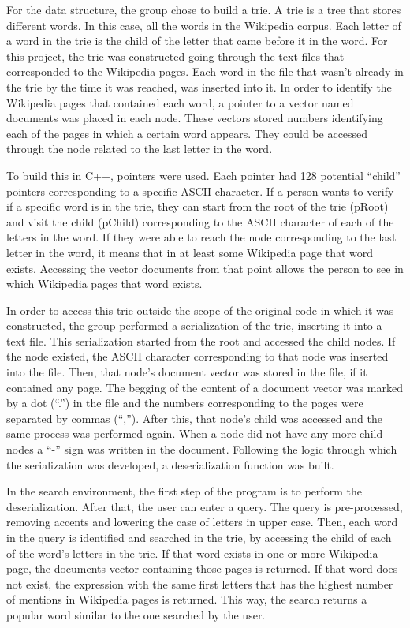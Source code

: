 \documentclass{article}
\begin{document}
For the data structure, the group chose to build a trie. A trie is a tree that stores different words. In this case, all the words in the Wikipedia corpus. Each letter of a word in the trie is the child of the letter that came before it in the word. 
For this project, the trie was constructed going through the text files that corresponded to the Wikipedia pages. Each word in the file that wasn't already in the trie by the time it was reached, was inserted into it. In order to identify the Wikipedia pages that contained each word, a pointer to a vector named documents was placed in each node. These vectors stored numbers identifying each of the pages in which a certain word appears. They could be accessed through the node related to the last letter in the word. 

To build this in C++, pointers were used. Each pointer had 128 potential ``child'' pointers corresponding to a specific ASCII character. If a person wants to verify if a specific word is in the trie, they can start from the root of the trie (pRoot) and visit the child (pChild) corresponding to the ASCII character of each of the letters in the word. If they were able to reach the node corresponding to the last letter in the word, it means that in at least some Wikipedia page that word exists. Accessing the vector documents from that point allows the person to see in which Wikipedia pages that word exists.


In order to access this trie outside the scope of the original code in which it was constructed, the group performed a serialization of the trie, inserting it into a text file. This serialization started from the root and accessed the child nodes. If the node existed, the ASCII character corresponding to that node was inserted into the file. Then, that node's  document vector was stored in the file, if it contained any page. The begging of the content of a document vector was marked by a dot (``.'') in the file and the numbers corresponding to the pages were separated by commas (``,''). After this, that node's child was accessed and the same process was performed again. When a node did not have any more child nodes a ``-'' sign was written in the document. Following the logic through which the serialization was developed, a deserialization function was built. 

In the search environment, the first step of the program is to perform the deserialization. After that, the user can enter a query.  The query is pre-processed, removing accents and lowering the case of letters in upper case. Then, each word in the query is identified and searched in the trie, by accessing the child of each of the word's letters in the trie. If that word exists in one or more Wikipedia page, the documents vector containing those pages is returned. If that word does not exist, the expression with the same first letters that has the highest number of mentions in Wikipedia pages is returned. This way, the search returns a popular word similar to the one searched by the user. 
\end{document}
